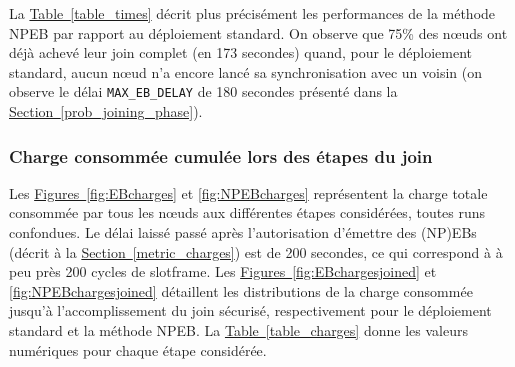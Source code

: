 \documentclass[]{report}
\newcommand{\wordlink}[2]{\hyperref[#2]{#1~\ref{#2}}}
\begin{document}
La \wordlink{Table}{table_times} décrit plus précisément les performances de la méthode NPEB par rapport au déploiement standard. On observe que 75\% des nœuds ont déjà achevé leur join complet (en 173 secondes) quand, pour le déploiement standard, aucun nœud n'a encore lancé sa synchronisation avec un voisin (on observe le délai \texttt{MAX\_EB\_DELAY} de 180 secondes présenté dans la \wordlink{Section}{prob_joining_phase}).



\subsubsection{Charge consommée cumulée lors des étapes du join}
\label{results_charges}

Les \wordlink{Figures}{fig:EBcharges} et \ref{fig:NPEBcharges} représentent la charge totale consommée par tous les nœuds aux différentes étapes considérées, toutes runs confondues. Le délai laissé passé après l'autorisation d'émettre des (NP)EBs (décrit à la \wordlink{Section}{metric_charges}) est de 200 secondes, ce qui correspond à à peu près 200 cycles de slotframe. Les \wordlink{Figures}{fig:EBchargesjoined} et \ref{fig:NPEBchargesjoined} détaillent les distributions de la charge consommée jusqu'à l'accomplissement du join sécurisé, respectivement pour le déploiement standard et la méthode NPEB. La \wordlink{Table}{table_charges} donne les valeurs numériques pour chaque étape considérée.

\vspace{0.2cm}
\end{document}
